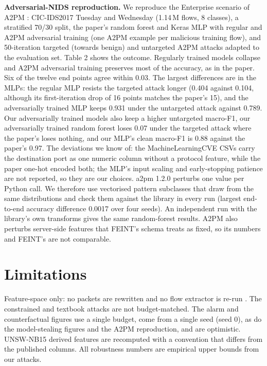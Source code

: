 \documentclass[11pt]{article}
\begin{document}
\textbf{Adversarial-NIDS reproduction.} We reproduce the Enterprise scenario of A2PM
\cite{vitorino2022}: CIC-IDS2017 Tuesday and Wednesday (1.14\,M flows, 8 classes), a stratified
70/30 split, the paper's random forest and Keras MLP with regular and A2PM adversarial training (one
A2PM example per malicious training flow), and 50-iteration targeted (towards benign) and untargeted
A2PM attacks adapted to the evaluation set. Table 2 shows the outcome. Regularly trained models
collapse and A2PM adversarial training preserves most of the accuracy, as in the paper. Six of the
twelve end points agree within 0.03. The largest differences are in the MLPs: the regular MLP resists
the targeted attack longer (0.404 against 0.104, although its first-iteration drop of 16 points
matches the paper's 15), and the adversarially trained MLP keeps 0.931 under the untargeted attack
against 0.789. Our adversarially trained models also keep a higher untargeted macro-F1, our
adversarially trained random forest loses 0.07 under the targeted attack where the paper's loses
nothing, and our MLP's clean macro-F1 is 0.88 against the paper's 0.97. The deviations we know of: the
MachineLearningCVE CSVs carry the destination port as one numeric column without a protocol
feature, while the paper one-hot encoded both; the MLP's input scaling and early-stopping patience
are not reported, so they are our choices. a2pm 1.2.0 perturbs one value per Python call. We
therefore use vectorised pattern subclasses that draw from the same distributions and check them
against the library in every run (largest end-to-end accuracy difference 0.0017 over four seeds).
An independent run with the library's own transforms gives the same random-forest results. A2PM
also perturbs server-side features that FEINT's schema treats as fixed, so its numbers and FEINT's
are not comparable.

\section{Limitations}
Feature-space only: no packets are rewritten and no flow extractor is re-run
\cite{pierazzi2020}. The constrained and textbook attacks are not budget-matched. The alarm and
counterfactual figures use a single budget, come from a single seed (seed 0), as do the
model-stealing figures and the A2PM reproduction, and are optimistic. UNSW-NB15 derived features are
recomputed with a convention that differs from the published columns. All robustness numbers are
empirical upper bounds from our attacks.
\end{document}

